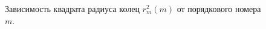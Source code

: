 \documentclass[a4paper,12pt]{article}
\theoremstyle{plain} %
\theoremstyle{definition} %
\theoremstyle{remark} %
\begin{document}
\begin{figure}[h!]
	\noindent{}
	\vspace{-0.5cm}
	\caption{ Зависимость квадрата радиуса колец $r^2_m(m)$ от порядкового номера $m$.}
	\label{graph}
\end{figure}
\end{document}

